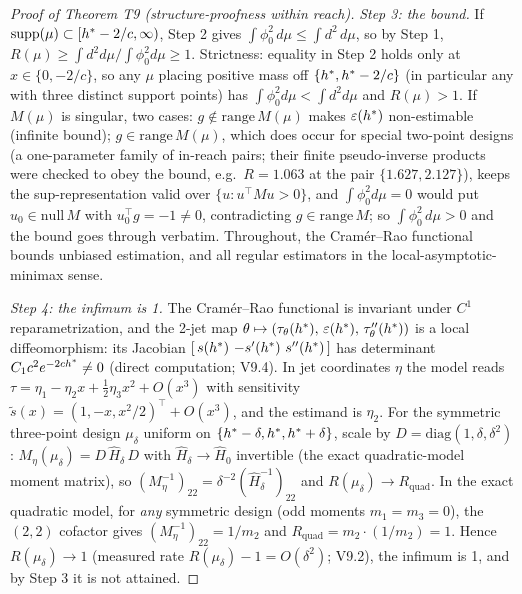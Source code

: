 \documentclass[11pt]{article}
\begin{document}
\begin{proof}[Proof of Theorem T9 (structure-proofness within reach)]
\emph{Step 3: the bound.} If $\mathrm{supp}(\mu) \subset
[h^{*} - 2/c, \infty)$, Step 2 gives $\int \phi_0^2\, d\mu \le \int
d^2\, d\mu$, so by Step 1, $R(\mu) \ge \int d^2 d\mu / \int \phi_0^2
d\mu \ge 1$. Strictness: equality in Step 2 holds only at
$x \in \{0, -2/c\}$, so any $\mu$ placing positive mass off
$\{h^{*}, h^{*} - 2/c\}$ (in particular any with three distinct
support points) has $\int \phi_0^2 d\mu < \int d^2 d\mu$ and
$R(\mu) > 1$. If $M(\mu)$ is singular, two cases:
$g \notin \mathrm{range}\,M(\mu)$ makes $\varepsilon(h^{*})$ non-estimable
(infinite bound); $g \in \mathrm{range}\,M(\mu)$, which does occur for
special two-point designs (a one-parameter family of in-reach pairs;
their finite pseudo-inverse products were checked to obey the bound,
e.g.\ $R = 1.063$ at the pair $\{1.627, 2.127\}$), keeps
the sup-representation valid over $\{u : u^\top M u > 0\}$, and
$\int \phi_0^2 d\mu = 0$ would put $u_0 \in \mathrm{null}\, M$ with
$u_0^\top g = -1 \neq 0$, contradicting $g \in \mathrm{range}\,M$; so
$\int \phi_0^2\, d\mu > 0$ and the bound goes through verbatim.
Throughout, the Cram\'er--Rao functional bounds unbiased estimation,
and all regular estimators in the local-asymptotic-minimax sense.

\emph{Step 4: the infimum is 1.} The Cram\'er--Rao functional is
invariant under $C^1$ reparametrization, and the 2-jet map
$\theta \mapsto (\tau_\theta(h^{*}),\, \varepsilon(h^{*}),\,
\tau_\theta''(h^{*}))$ is a local diffeomorphism: its Jacobian
$[\,s(\hstar)\ {-s'(\hstar)}\ s''(\hstar)\,]$ has determinant
$C_1 c^2 e^{-2ch^{*}} \neq 0$ (direct computation; V9.4). In jet
coordinates $\eta$ the model reads $\tau = \eta_1 - \eta_2 x +
\tfrac{1}{2}\eta_3 x^2 + O(x^3)$ with sensitivity $\tilde s(x) =
(1, -x, x^2/2)^\top + O(x^3)$, and the estimand is $\eta_2$. For the
symmetric three-point design $\mu_\delta$ uniform on $\{h^{*} -
\delta, h^{*}, h^{*} + \delta\}$, scale by $D = \mathrm{diag}(1,
\delta, \delta^2)$: $M_\eta(\mu_\delta) = D\,\hat H_\delta\, D$ with
$\hat H_\delta \to \hat H_0$ invertible (the exact quadratic-model
moment matrix), so $(M_\eta^{-1})_{22} = \delta^{-2}(\hat
H_\delta^{-1})_{22}$ and $R(\mu_\delta) \to R_{\mathrm{quad}}$. In
the exact quadratic model, for \emph{any} symmetric design (odd
moments $m_1 = m_3 = 0$), the $(2,2)$ cofactor gives
$(M_\eta^{-1})_{22} = 1/m_2$ and $R_{\mathrm{quad}} = m_2 \cdot
(1/m_2) = 1$. Hence $R(\mu_\delta) \to 1$ (measured rate
$R(\mu_\delta) - 1 = O(\delta^2)$; V9.2), the infimum is 1, and by
Step 3 it is not attained.


\end{proof}
\end{document}
